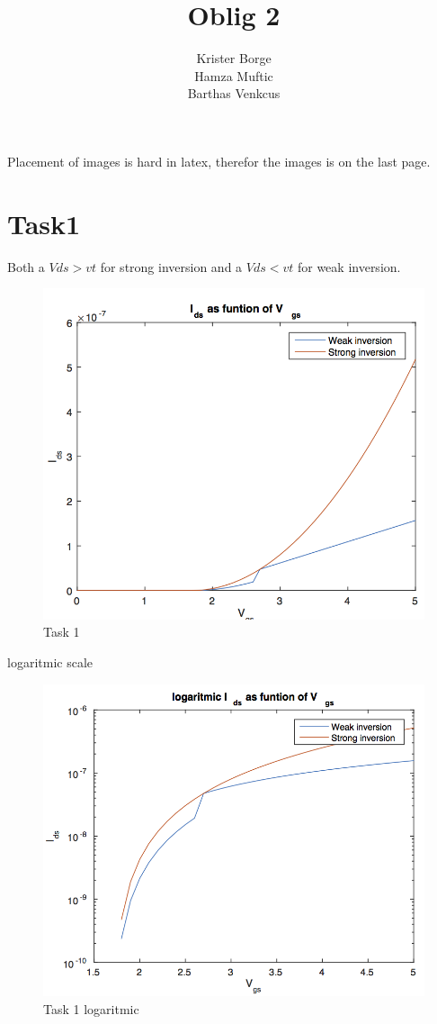 \documentclass[11pt,a4paper,final]{report}
\author{Krister Borge \\Hamza Muftic \\Barthas Venkcus}
\title{Oblig 2 }
\begin{document}
\maketitle


Placement of images is hard in latex, therefor the images is on the last page.
\section{ Task1 }

	Both a $Vds > vt$ for strong inversion and a $ Vds<vt$ for weak inversion.
\begin{figure}[h!btp]
\caption{Task 1}
\includegraphics[scale=1]{1task1.png}
\end{figure}

	logaritmic scale
	
\begin{figure}[h!btp]
\caption{Task 1 logaritmic}
\includegraphics[scale=1]{1task1log.png}
\end{figure}
\end{document}

